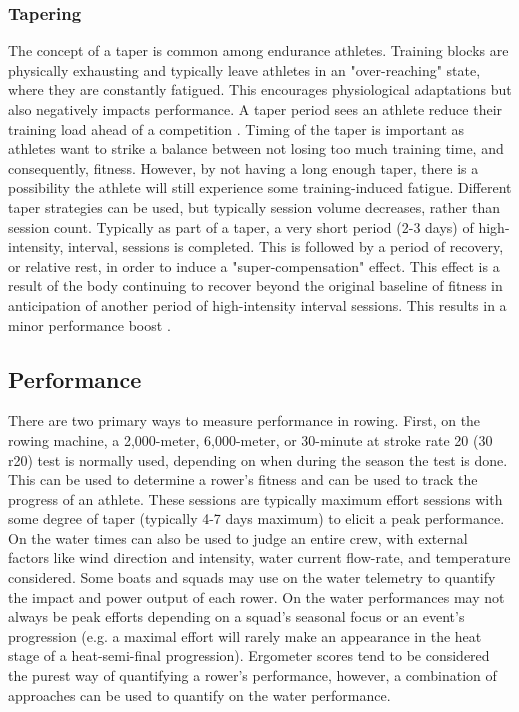 \subsubsection{Tapering}
The concept of a taper is common among endurance athletes. Training blocks are physically exhausting and typically leave athletes in an "over-reaching" state, where they are constantly fatigued. This encourages physiological adaptations but also negatively impacts performance. A taper period sees an athlete reduce their training load ahead of a competition \cite{Lawton2023}. Timing of the taper is important as athletes want to strike a balance between not losing too much training time, and consequently, fitness. However, by not having a long enough taper, there is a possibility the athlete will still experience some training-induced fatigue. Different taper strategies can be used, but typically session volume decreases, rather than session count. Typically as part of a taper, a very short period (2-3 days) of high-intensity, interval, sessions is completed. This is followed by a period of recovery, or relative rest, in order to induce a "super-compensation" effect. This effect is a result of the body continuing to recover beyond the original baseline of fitness in anticipation of another period of high-intensity interval sessions. This results in a minor performance boost \cite{Kanwetz2016}.


\subsection{Performance}
There are two primary ways to measure performance in rowing. First, on the rowing machine, a 2,000-meter, 6,000-meter, or 30-minute at stroke rate 20 (30 r20) test is normally used, depending on when during the season the test is done. This can be used to determine a rower's fitness and can be used to track the progress of an athlete. These sessions are typically maximum effort sessions with some degree of taper (typically 4-7 days maximum) to elicit a peak performance. On the water times can also be used to judge an entire crew, with external factors like wind direction and intensity, water current flow-rate, and temperature considered. Some boats and squads may use on the water telemetry to quantify the impact and power output of each rower. On the water performances may not always be peak efforts depending on a squad's seasonal focus or an event's progression (e.g. a maximal effort will rarely make an appearance in the heat stage of a heat-semi-final progression). Ergometer scores tend to be considered the purest way of quantifying a rower's performance, however, a combination of approaches can be used to quantify on the water performance.

